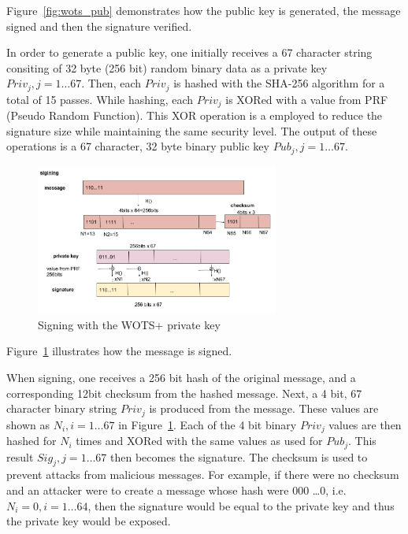 \documentclass[a4paper,10pt,twocolumn]{article}
\begin{document}
 Figure~\ref{fig:wots_pub} demonstrates how the public key is generated, the message signed and then the signature verified.

 In order to generate a public key, one initially receives a 67 character string consiting of 32 byte (256 bit) random binary data as a 
 private key \( Priv_{j}, j=1 \ldots 67\). Then, each \( Priv_{j} \) is hashed with the SHA-256 algorithm for a total of 15 passes. 
 While hashing, each \( Priv_{j} \) is XORed with a value from PRF (Pseudo Random Function). This XOR operation is a employed to reduce 
 the signature size while maintaining the same security level. The output of these operations is a 67 character, 32 byte binary public 
 key \( Pub_{j}, j=1 \ldots 67\).

 \begin{figure}[ht]
	\begin{center}
	\includegraphics[width=80mm]{wots_sign.png}
	  \caption{Signing with the WOTS+ private key}
    \label{fig:wots_sign}
	\end{center}
 \end{figure}

 Figure~\ref{fig:wots_sign} illustrates how the message is signed.

 When signing, one receives a 256 bit hash of the original message, and a corresponding 12bit checksum from the hashed message.
 Next, a 4 bit, 67 character binary string \( Priv_j \) is produced from the message. These values are shown as \(N_i,i=1 \ldots 67\) in 
 Figure~\ref{fig:wots_sign}. Each of the 4 bit binary \( Priv_j \) values are then hashed for \(N_i\) times and XORed with the same 
 values as used for \( Pub_{j} \). This result \( Sig_j, j=1 \ldots 67 \) then becomes the signature. The checksum is used to prevent 
 attacks from malicious messages. For example, if there were no checksum and an attacker were to create a message whose hash were 000 
 \ldots 0, i.e. \( N_i = 0, i=1 \ldots 64 \), then the signature would be equal to the private key and thus the private key would be 
 exposed.
\end{document}
